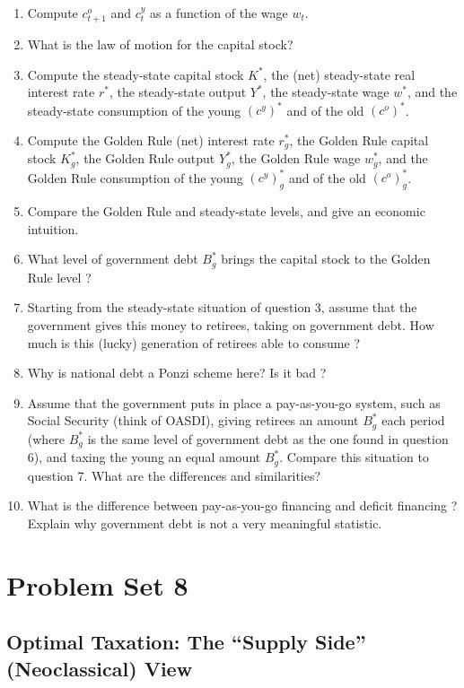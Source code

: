 \documentclass[]{book}
\begin{document}
\begin{enumerate}
\def\labelenumi{\arabic{enumi}.}
\item
  Compute \(c_{t+1}^o\) and \(c_t^y\) as a function of the wage \(w_t\).
\item
  What is the law of motion for the capital stock?
\item
  Compute the steady-state capital stock \(K^{*}\), the (net)
  steady-state real interest rate \(r^{*}\), the steady-state output
  \(Y^{*}\), the steady-state wage \(w^{*}\), and the steady-state
  consumption of the young \((c^y)^{*}\) and of the old \((c^o)^{*}\).
\item
  Compute the Golden Rule (net) interest rate \(r^{*}_g\), the Golden
  Rule capital stock \(K^{*}_g\), the Golden Rule output \(Y^{*}_g\),
  the Golden Rule wage \(w^{*}_g\), and the Golden Rule consumption of
  the young \((c^y)^{*}_g\) and of the old \((c^o)^{*}_g\).
\item
  Compare the Golden Rule and steady-state levels, and give an economic
  intuition.
\item
  What level of government debt \(B^{*}_g\) brings the capital stock to
  the Golden Rule level ?
\item
  Starting from the steady-state situation of question 3, assume that
  the government gives this money to retirees, taking on government
  debt. How much is this (lucky) generation of retirees able to consume
  ?
\item
  Why is national debt a Ponzi scheme here? Is it bad ?
\item
  Assume that the government puts in place a pay-as-you-go system, such
  as Social Security (think of OASDI), giving retirees an amount
  \(B^{*}_g\) each period (where \(B^{*}_g\) is the same level of
  government debt as the one found in question 6), and taxing the young
  an equal amount \(B^{*}_g\). Compare this situation to question 7.
  What are the differences and similarities?
\item
  What is the difference between pay-as-you-go financing and deficit
  financing ? Explain why government debt is not a very meaningful
  statistic.
\end{enumerate}

\chapter{Problem Set 8}\label{pset8}

\section{\texorpdfstring{Optimal Taxation: The ``Supply Side''
(Neoclassical)
View}{Optimal Taxation: The Supply Side (Neoclassical) View}}\label{optimal-taxation-the-supply-side-neoclassical-view}
\end{document}

